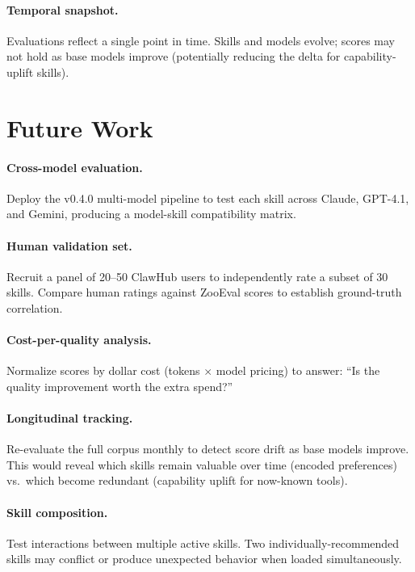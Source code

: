 \documentclass[11pt,a4paper]{article}
\begin{document}
\paragraph{Temporal snapshot.}
Evaluations reflect a single point in time. Skills and models evolve; scores may not hold as base models improve (potentially reducing the delta for capability-uplift skills).

\section{Future Work}
\label{sec:future}

\paragraph{Cross-model evaluation.}
Deploy the v0.4.0 multi-model pipeline to test each skill across Claude, GPT-4.1, and Gemini, producing a model-skill compatibility matrix.

\paragraph{Human validation set.}
Recruit a panel of 20--50 ClawHub users to independently rate a subset of 30 skills. Compare human ratings against ZooEval scores to establish ground-truth correlation.

\paragraph{Cost-per-quality analysis.}
Normalize scores by dollar cost (tokens $\times$ model pricing) to answer: ``Is the quality improvement worth the extra spend?''

\paragraph{Longitudinal tracking.}
Re-evaluate the full corpus monthly to detect score drift as base models improve. This would reveal which skills remain valuable over time (encoded preferences) vs.\ which become redundant (capability uplift for now-known tools).

\paragraph{Skill composition.}
Test interactions between multiple active skills. Two individually-recommended skills may conflict or produce unexpected behavior when loaded simultaneously.
\end{document}
